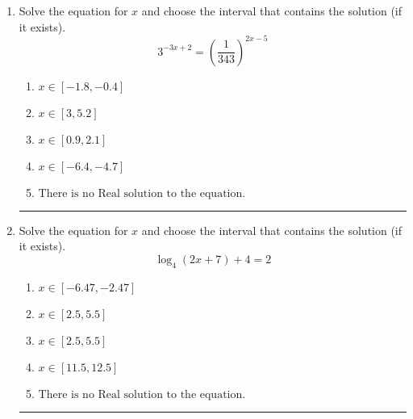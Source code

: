 \documentclass[14pt]{extbook}
\newcommand{\litem}[1]{\item#1\hspace*{-1cm}\rule{\textwidth}{0.4pt}}
\begin{document}
\begin{enumerate}
{\begin{enumerate}[label=\Alph*.]
\end{enumerate} }
\litem{
Solve the equation for $x$ and choose the interval that contains the solution (if it exists).\[ 3^{-3x+2} = \left(\frac{1}{343}\right)^{2x-5} \]\begin{enumerate}[label=\Alph*.]
\item \( x \in [-1.8, -0.4] \)
\item \( x \in [3, 5.2] \)
\item \( x \in [0.9, 2.1] \)
\item \( x \in [-6.4, -4.7] \)
\item \( \text{There is no Real solution to the equation.} \)

\end{enumerate} }
\litem{
Solve the equation for $x$ and choose the interval that contains the solution (if it exists).\[ \log_{4}{(2x+7)}+4 = 2 \]\begin{enumerate}[label=\Alph*.]
\item \( x \in [-6.47, -2.47] \)
\item \( x \in [2.5, 5.5] \)
\item \( x \in [2.5, 5.5] \)
\item \( x \in [11.5, 12.5] \)
\item \( \text{There is no Real solution to the equation.} \)

\end{enumerate} }
\end{enumerate}
\end{document}

